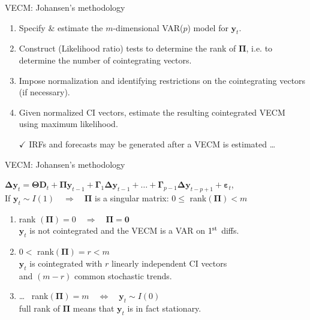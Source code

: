 \documentclass[usenames,dvipsnames]{beamer}
\begin{document}
\begin{frame}{VECM: Johansen’s methodology}
\begin{enumerate}[1.]
\item Specify \& estimate the $m$-dimensional VAR($p$) model for $\bm{y}_t$.
\vspace{0.2cm}
\item Construct (Likelihood ratio) tests to determine the rank of $\bm{\Pi}$, i.e. to determine the number of cointegrating vectors.
\vspace{0.2cm}
\item Impose normalization and identifying restrictions on the cointegrating vectors (if necessary).
\vspace{0.2cm}
\item Given normalized CI vectors, estimate the resulting cointegrated VECM using maximum likelihood.
\end{enumerate}
\begin{itemize}
\item[$\checkmark$] IRFs and forecasts may be generated after a VECM is estimated \dots
\end{itemize}
\end{frame}
\begin{frame}{VECM: Johansen’s methodology}

$\bm{\Delta}\bm{y}_t = \bm{\Theta} \bm{D}_t + \bm{\Pi} \bm{y}_{t-1} + \bm{\Gamma}_1 \bm{\Delta} \bm{y}_{t-1} + \dots + \bm{\Gamma}_{p-1} \bm{\Delta} \bm{y}_{t-p+1} + \bm{\varepsilon}_t$, \\
\bigskip
If $\bm{y}_t \sim I(1) \quad \Rightarrow \quad \bm{\Pi}$ is a singular matrix: $0 \leq$ rank$(\bm{\Pi}) < m$
\bigskip
\begin{enumerate}
    \item rank $(\bm{\Pi}) = 0 \quad \Rightarrow \quad \bm{\Pi} = \bm{0}$\\
    $\bm{y}_t$ is not cointegrated and the VECM is a VAR on $1^{\textnormal{st}}$ diffs.\\
    \bigskip
    \item $0 <$ rank$(\bm{\Pi}) = r < m$\\
    $\bm{y}_t$ is cointegrated with $r$ linearly independent CI vectors\\
    and $(m-r)$ common stochastic trends.
    \bigskip
    \item \dots~ rank$(\bm{\Pi}) = m \quad \Longleftrightarrow \quad \bm{y}_t \sim I(0)$\\full rank of $\bm{\Pi}$ means that $\bm{y}_t$ is in fact stationary.
\end{enumerate}
\end{frame}
\end{document}
